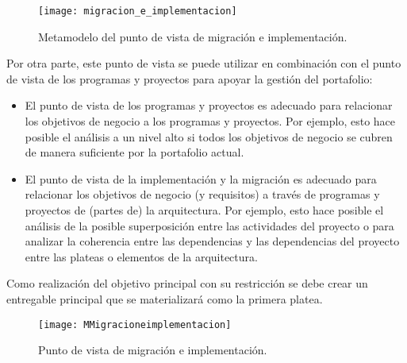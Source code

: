\begin{figure}[H]
\centering
\texttt{[image: migracion\_e\_implementacion]}
\caption{Metamodelo del punto de vista de migración e implementación.}
\end{figure}

Por otra parte, este punto de vista se puede utilizar en combinación con el punto de vista de los programas y proyectos para apoyar la gestión del portafolio: 
\begin{itemize}
        \item El punto de vista de los programas y proyectos es adecuado para relacionar los objetivos de negocio a los programas y proyectos. Por ejemplo, esto hace posible el análisis a un nivel alto si todos los objetivos de negocio se cubren de manera suficiente por la portafolio actual. 
        \item El punto de vista de la implementación y la migración es adecuado para relacionar los objetivos de negocio (y requisitos) a través de programas y proyectos de (partes de) la arquitectura. Por ejemplo, esto hace posible el análisis de la posible superposición entre las actividades del proyecto o para analizar la coherencia entre las dependencias y las dependencias del proyecto entre las plateas o elementos de la arquitectura.
\end{itemize}

Como realización del objetivo principal con su restricción se debe crear un entregable principal que se materializará como la primera platea.

\begin{figure}[H]
\centering
\texttt{[image: MMigracioneimplementacion]}
\caption{Punto de vista de migración e implementación.}
\end{figure}

